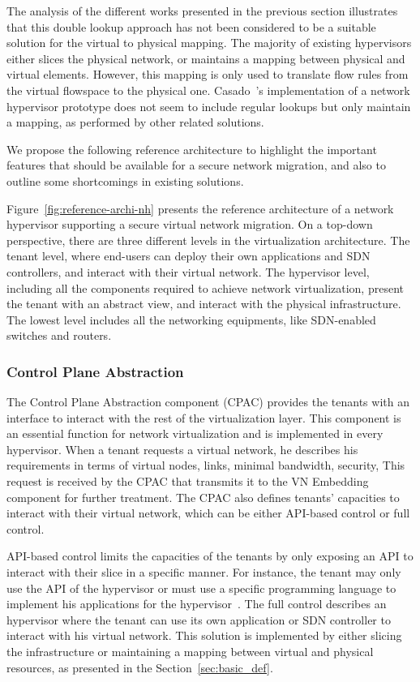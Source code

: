 The analysis of the different works presented in the previous section illustrates that this double lookup approach has not been considered to be a suitable solution for the virtual to physical mapping. The majority of existing hypervisors either slices the physical network, or maintains a mapping between physical and virtual elements. However, this mapping is only used to translate flow rules from the virtual flowspace to the physical one. Casado~\etal's  implementation of a network hypervisor prototype does not seem to include regular lookups but only maintain a mapping, as performed by other related solutions.

We propose the following reference architecture to highlight the important features that should be available for a secure network migration, and also to outline some shortcomings in existing solutions.


  
Figure~\ref{fig:reference-archi-nh} presents the reference architecture of a network hypervisor supporting a secure virtual network migration.
On a top-down perspective, there are three different levels in the virtualization architecture.
The tenant level, where end-users can deploy their own applications and SDN controllers, and interact with their virtual network.
The hypervisor level, including all the components required to achieve network virtualization, present the tenant with an abstract view, and interact with the physical infrastructure.
The lowest level includes all the networking equipments, like SDN-enabled switches and routers.

\subsubsection{Control Plane Abstraction}
The Control Plane Abstraction component (CPAC) provides the tenants with an interface to interact with the rest of the virtualization layer.
This component is an essential function for network virtualization and is implemented in every hypervisor.
When a tenant requests a virtual network, he describes his requirements in terms of virtual nodes, links, minimal bandwidth, security, \etc This request is received by the CPAC that transmits it to the VN Embedding component for further treatment.
The CPAC also defines tenants' capacities to interact with their virtual network, which can be either API-based control or full control.

API-based control limits the capacities of the tenants by only exposing an API to interact with their slice in a specific manner. For instance, the tenant may only use the API of the hypervisor or must use a specific programming language to implement his applications for the hypervisor~\cite{CompositionalHypervisor-Jin2014,NetworkHypervisor-Huang2013}. 
The full control describes an hypervisor where the tenant can use its own application or SDN controller to interact with his virtual network. This solution is implemented by either slicing the infrastructure or maintaining a mapping between virtual and physical resources, as presented in the Section~\ref{sec:basic_def}.



